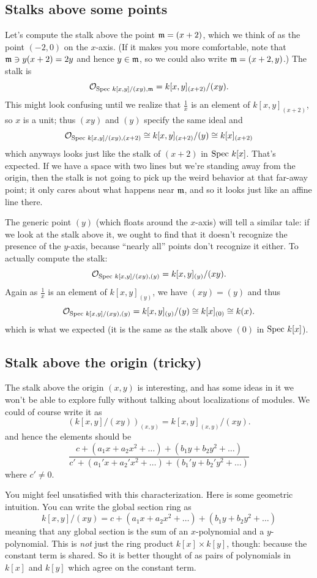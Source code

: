 \subsection{Stalks above some points}
Let's compute the stalk above the point $\mathfrak m = (x+2)$,
which we think of as the point $(-2,0)$ on the $x$-axis.
(If it makes you more comfortable, note that $\mathfrak m \ni y(x+2) = 2y$
and hence $y \in \mathfrak m$, so we could also write $\mathfrak m = (x+2,y)$.)
The stalk is
\[ \mathcal O_{\text{Spec } k[x,y] / (xy), \mathfrak m} = k[x,y]_{(x+2)} / (xy). \]
This might look confusing until we realize that $\frac1x$
is an element of $k[x,y]_{(x+2)}$, so $x$ is a unit;
thus $(xy)$ and $(y)$ specify the same ideal and
\[ \mathcal O_{\text{Spec } k[x,y] / (xy), (x+2)} \cong k[x,y]_{(x+2)} / (y)
	\cong k[x]_{(x+2)}  \]
which anyways looks just like the stalk of $(x+2)$ in $\text{Spec } k[x]$.
That's expected.
If we have a space with two lines but we're
standing away from the origin,
then the stalk is not going to pick up the weird behavior
at that far-away point;
it only cares about what happens near $\mathfrak m$,
and so it looks just like an affine line there.

The generic point $(y)$ (which floats around the $x$-axis)
will tell a similar tale:
if we look at the stalk above it,
we ought to find that it doesn't recognize the presence of the $y$-axis,
because ``nearly all'' points don't recognize it either.
To actually compute the stalk:
\[ \mathcal O_{\text{Spec } k[x,y] / (xy), (y)} = k[x,y]_{(y)} / (xy). \]
Again as $\frac1x$ is an element of $k[x,y]_{(y)}$,
we have $(xy) = (y)$ and thus
\[ \mathcal O_{\text{Spec } k[x,y] / (xy), (y)} = k[x,y]_{(y)} / (y)
	\cong k[x]_{(0)} \cong k(x). \]
which is what we expected
(it is the same as the stalk above $(0)$ in $\text{Spec } k[x]$).

\subsection{Stalk above the origin (tricky)}
The stalk above the origin $(x,y)$ is interesting,
and has some ideas in it we won't be able to explore fully
without talking about localizations of modules.
We could of course write it as
\[ (k[x,y] / (xy))_{(x,y)}
	= k[x,y]_{(x,y)} / (xy). \]
and hence the elements should be
\[ \frac{c + (a_1 x + a_2 x^2 + \dots)
	+ (b_1 y + b_2 y^2 + \dots)}
	{c' + (a_1' x + a_2' x^2 + \dots)
	+ (b_1' y + b_2' y^2 + \dots)}
\]
where $c' \ne 0$.

You might feel unsatisfied with this characterization.
Here is some geometric intuition.
You can write the global section ring as
\[ k[x,y] / (xy) = c + (a_1 x + a_2 x^2 + \dots)
	+ (b_1 y + b_2 y^2 + \dots) \]
meaning that any global section is the sum of an $x$-polynomial
and a $y$-polynomial.
This is \emph{not} just the ring product $k[x] \times k[y]$, though:
because the constant term is shared.
So it is better thought of as pairs of polynomials in $k[x]$
and $k[y]$ which agree on the constant term.

